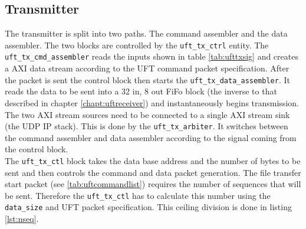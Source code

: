 \subsection{Transmitter}
The transmitter is split into two paths. The command assembler and the data
assembler. The two blocks are controlled by the \texttt{uft\_tx\_ctrl} entity.
The \texttt{uft\_tx\_cmd\_assembler} reads the inputs shown in table 
\ref{tab:ufttxsig} and creates a AXI data stream according to the UFT command
packet specification. After the packet is sent the control block then starts the
\texttt{uft\_tx\_data\_assembler}. It reads the data to be sent into a 32 in, 8
out FiFo block (the inverse to that described in chapter \ref{chapt:uftreceiver}) and
instantaneously begins transmission. The two AXI stream sources need to be
connected to a single AXI stream sink (the UDP IP stack). This is done by the
\texttt{uft\_tx\_arbiter}. It switches between the command assembler and data
assembler according to the signal coming from the control block.
\\

The \texttt{uft\_tx\_ctl} block takes the data base address and the number of
bytes to be sent and then controls the command and data packet generation. The
file transfer start packet (see \ref{tab:uftcommandlist}) requires the number of
sequences that will be sent. Therefore the \texttt{uft\_tx\_ctl} has to
calculate this number using the \texttt{data\_size} and UFT packet
specification. This ceiling division is done in listing \ref{lst:nseq}.
\\

